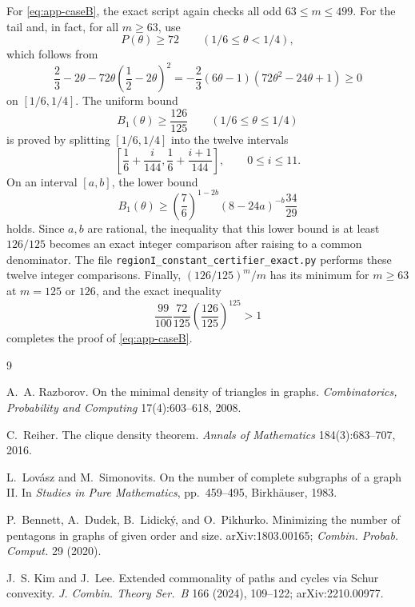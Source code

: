 \documentclass[11pt]{article}
\begin{document}
For \eqref{eq:app-caseB}, the exact script again checks all odd $63\le m\le499$.  For the tail and, in fact, for all $m\ge63$, use
\[
        P(\theta)\ge72
        \qquad(1/6\le\theta<1/4),
\]
which follows from
\[
        \frac23-2\theta-72\theta\left(\frac12-2\theta\right)^2
        =-\frac23(6\theta-1)(72\theta^2-24\theta+1)
        \ge0
\]
on $[1/6,1/4]$.  The uniform bound
\[
        B_1(\theta)\ge\frac{126}{125}
        \qquad(1/6\le\theta\le1/4)
\]
is proved by splitting $[1/6,1/4]$ into the twelve intervals
\[
        \left[\frac16+\frac{i}{144},\frac16+\frac{i+1}{144}\right],
        \qquad 0\le i\le11.
\]
On an interval $[a,b]$, the lower bound
\[
        B_1(\theta)\ge
        \left(\frac76\right)^{1-2b}(8-24a)^{-b}\frac{34}{29}
\]
holds.  Since $a,b$ are rational, the inequality that this lower bound is at least $126/125$ becomes an exact integer comparison after raising to a common denominator.  The file \texttt{regionI\_constant\_certifier\_exact.py} performs these twelve integer comparisons.  Finally, $(126/125)^m/m$ has its minimum for $m\ge63$ at $m=125$ or $126$, and the exact inequality
\[
        \frac{99}{100}\frac{72}{125}\left(\frac{126}{125}\right)^{125}>1
\]
completes the proof of \eqref{eq:app-caseB}.

\begin{thebibliography}{9}

A.~A. Razborov.
\newblock On the minimal density of triangles in graphs.
\newblock \emph{Combinatorics, Probability and Computing} 17(4):603--618, 2008.

C.~Reiher.
\newblock The clique density theorem.
\newblock \emph{Annals of Mathematics} 184(3):683--707, 2016.

L.~Lov\'asz and M.~Simonovits.
\newblock On the number of complete subgraphs of a graph II.
\newblock In \emph{Studies in Pure Mathematics}, pp.\ 459--495, Birkh\"auser, 1983.

P.~Bennett, A.~Dudek, B.~Lidick\'y, and O.~Pikhurko.
\newblock Minimizing the number of pentagons in graphs of given order and size.
\newblock arXiv:1803.00165; \emph{Combin. Probab. Comput.} 29 (2020).


J.~S. Kim and J.~Lee.
\newblock Extended commonality of paths and cycles via Schur convexity.
\newblock \emph{J. Combin. Theory Ser.~B} 166 (2024), 109--122; arXiv:2210.00977.

\end{thebibliography}
\end{document}
